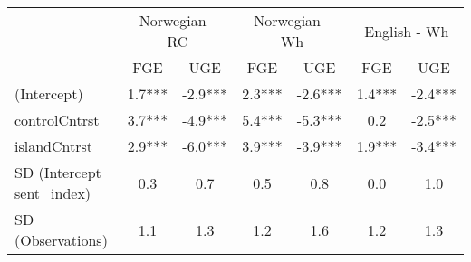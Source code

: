 \begin{longtable}{lcccccc}
\toprule
 & \multicolumn{2}{c}{Norwegian - RC} & \multicolumn{2}{c}{Norwegian - Wh} & \multicolumn{2}{c}{English - Wh} \\ 
\cmidrule(lr){2-3} \cmidrule(lr){4-5} \cmidrule(lr){6-7}
  & FGE & UGE & FGE & UGE & FGE & UGE \\ 
\midrule\addlinespace[2.5pt]
(Intercept) & 1.7*** & -2.9*** & 2.3*** & -2.6*** & 1.4*** & -2.4*** \\ 
controlCntrst & 3.7*** & -4.9*** & 5.4*** & -5.3*** & 0.2 & -2.5*** \\ 
islandCntrst & 2.9*** & -6.0*** & 3.9*** & -3.9*** & 1.9*** & -3.4*** \\ 
SD (Intercept sent\_index) & 0.3 & 0.7 & 0.5 & 0.8 & 0.0 & 1.0 \\ 
SD (Observations) & 1.1 & 1.3 & 1.2 & 1.6 & 1.2 & 1.3 \\ 
\bottomrule
\end{longtable}

